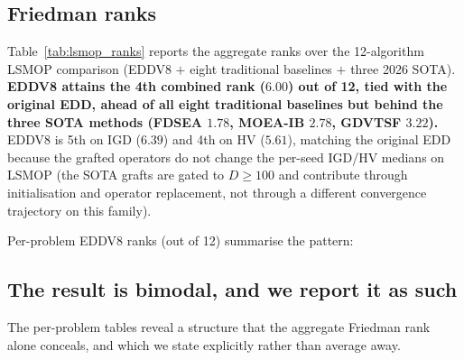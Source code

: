 \documentclass[preprint,12pt]{elsarticle}
\begin{document}
\subsection{Friedman ranks}

Table~\ref{tab:lsmop_ranks} reports the aggregate ranks over the
12-algorithm LSMOP comparison (EDDV8 $+$ eight traditional baselines $+$
three 2026 SOTA). \textbf{EDDV8 attains the 4th combined rank ($6.00$) out
of 12, tied with the original EDD, ahead of all eight traditional
baselines but behind the three SOTA methods (FDSEA $1.78$, MOEA-IB $2.78$,
GDVTSF $3.22$).} EDDV8 is 5th on IGD ($6.39$) and 4th on HV ($5.61$),
matching the original EDD because the grafted operators do not change the
per-seed IGD/HV medians on LSMOP (the SOTA grafts are gated to
$D \ge 100$ and contribute through initialisation and operator
replacement, not through a different convergence trajectory on this
family).





Per-problem EDDV8 ranks (out of 12) summarise the pattern:

\begin{center}
\setlength{\tabcolsep}{4pt}
\end{center}

\subsection{The result is bimodal, and we report it as such}
\label{sec:bimodal}

The per-problem tables reveal a structure that the aggregate Friedman rank
alone conceals, and which we state explicitly rather than average away.
\end{document}
